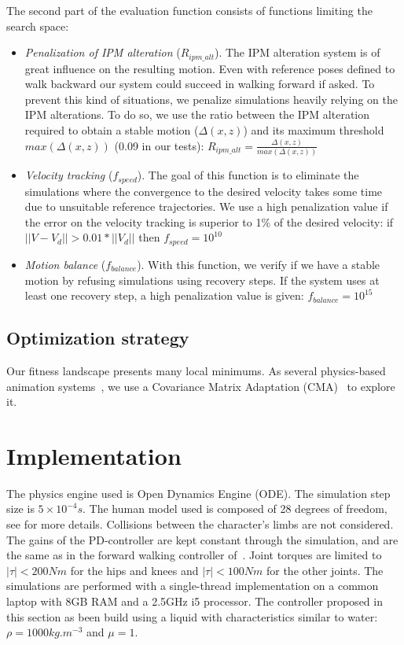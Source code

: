 \documentclass[conference]{acmsiggraph}
\begin{document}
The second part of the evaluation function consists of functions limiting the search space:
\begin{itemize}
\item{\textit{Penalization of IPM alteration} ($R_{ipm\_alt}$). The IPM alteration system is of great influence on the resulting motion. Even with reference poses defined to walk backward our system could succeed in walking forward if asked. To prevent this kind of situations, we penalize simulations heavily relying on the IPM alterations. To do so, we use the ratio between the IPM alteration required to obtain a stable motion ($\Delta(x,z)$) and its maximum threshold $max(\Delta(x,z))$ (0.09 in our tests): $R_{ipm\_alt}=\frac{\Delta(x,z)}{max(\Delta(x,z))}$}
\item{\textit{Velocity tracking} ($f_{speed}$). The goal of this function is to eliminate the simulations where the convergence to the desired velocity takes some time due to unsuitable reference trajectories. We use a high penalization value if the error on the velocity tracking is superior to 1\% of the desired velocity: if $||V-V_d||>0.01*||V_d||$ then $f_{speed}=10^{10}$}
\item{\textit{Motion balance} ($f_{balance}$). With this function, we verify if we have a stable motion by refusing simulations using recovery steps. If the system uses at least one recovery step, a high penalization value is given: $f_{balance}=10^{15}$}
\end{itemize}

\subsection{Optimization strategy}
Our fitness landscape presents many local minimums. As several physics-based animation systems~\cite{geijtenbeek2012simple,tan2011articulated}, we use a Covariance Matrix Adaptation (CMA)~\cite{hansen2006cma} to explore it.


\section{Implementation}
\label{sec:implementation}
The physics engine used is Open Dynamics Engine (ODE). The simulation step size is $5 \times 10^{-4}s$. The human model used is composed of 28 degrees of freedom, see \cite{coros2009robust} for more details. Collisions between the character's limbs are not considered. The gains of the PD-controller are kept constant through the simulation, and are the same as in the forward walking controller of~\cite{coros2009robust}. Joint torques are limited to $|\tau|<200Nm$  for the hips and knees and $|\tau|<100Nm$  for the other joints. The simulations are performed with a single-thread implementation on a common laptop with 8GB RAM and a 2.5GHz i5 processor. The controller proposed in this section as been build using a liquid with characteristics similar to water: $\rho=1000kg.m^{-3}$ and $\mu=1$.
\end{document}
